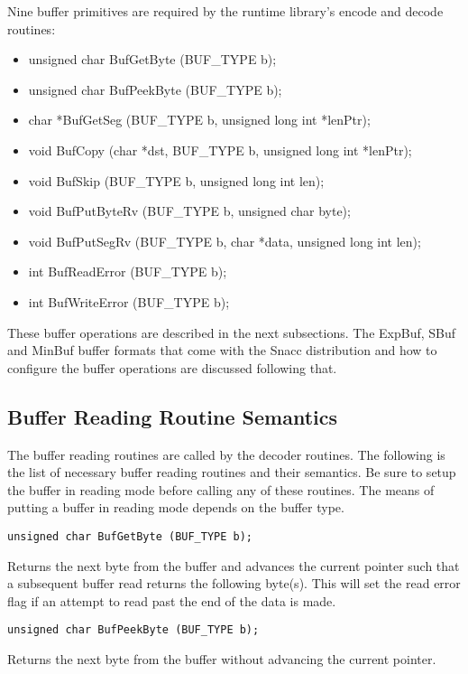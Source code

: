 Nine buffer primitives are required by the runtime library's encode
and decode routines:
\begin{itemize}
\item {\C unsigned char BufGetByte (BUF\_TYPE b);}
\item {\C unsigned char BufPeekByte (BUF\_TYPE b);}
\item {\C char *BufGetSeg (BUF\_TYPE b, unsigned long int *lenPtr);}
\item {\C void BufCopy (char *dst, BUF\_TYPE b, unsigned long int *lenPtr);}
\item {\C void BufSkip (BUF\_TYPE b, unsigned long int len);}
\item {\C void BufPutByteRv (BUF\_TYPE b,  unsigned char byte);}
\item {\C void BufPutSegRv (BUF\_TYPE b, char *data, unsigned long int len);}
\item {\C int BufReadError (BUF\_TYPE b);}
\item {\C int BufWriteError (BUF\_TYPE b);}
\end{itemize}

These buffer operations are described in the next subsections.  The
{\C ExpBuf}, {\C SBuf} and {\C MinBuf} buffer formats that come
with the Snacc distribution and how to configure the buffer operations
are discussed following that.

\subsection{\label{buf-read-c-section}Buffer Reading Routine Semantics}

The buffer reading routines are called by the decoder routines.  The
following is the list of necessary buffer reading routines and their
semantics.   Be sure to setup the buffer in reading mode before
calling any of these routines.  The means of putting a buffer in
reading mode depends on the buffer type.

\begin{verbatim}
unsigned char BufGetByte (BUF_TYPE b);
\end{verbatim}
Returns the next byte from the buffer and advances the current pointer
such that a subsequent buffer read returns the following byte(s).
This will set the read error flag if an attempt to read past the end
of the data is made.

\begin{verbatim}
unsigned char BufPeekByte (BUF_TYPE b);
\end{verbatim}
Returns the next byte from the buffer without advancing the current
pointer.


